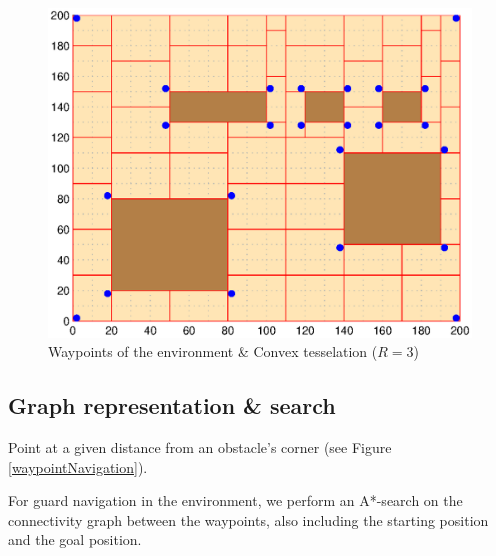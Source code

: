 \begin{figure}[h!t]
	\includegraphics[width=\linewidth]{fig/convexCover.eps}
	\caption{Waypoints of the environment \& Convex tesselation ($R=3$)}
	\label{convexTesselation}
\end{figure}


\subsection{Graph representation \& search}
\begin{definition}[Waypoint]
Point at a given distance from an obstacle's corner (see Figure \ref{waypointNavigation}).
\end{definition}
For guard navigation in the environment, we perform an A*-search on the connectivity graph between the waypoints, also including the starting position and the goal position.
